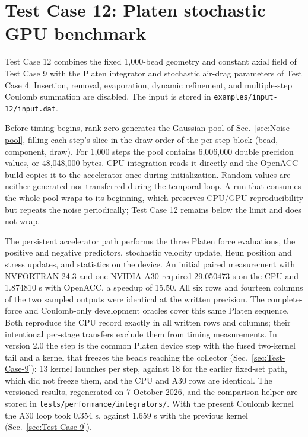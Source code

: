 \section{Test Case 12: Platen stochastic GPU benchmark}

Test Case 12 combines the fixed 1,000-bead geometry and constant axial field
of Test Case 9 with the Platen integrator and stochastic air-drag parameters
of Test Case 4. Insertion, removal, evaporation, dynamic refinement, and
multiple-step Coulomb summation are disabled. The input is stored in
\texttt{examples/input-12/input.dat}.

Before timing begins, rank zero generates the Gaussian pool of
Sec.~\ref{sec:Noise-pool}, filling each step's slice in the draw order of the
per-step block (bead, component, draw). For 1,000 steps the pool contains
6,006,000 double precision values, or 48,048,000 bytes. CPU integration reads
it directly and the OpenACC build copies it to the accelerator once during
initialization. Random values are neither generated nor transferred during
the temporal loop. A run that consumes the whole pool wraps to its beginning,
which preserves CPU/GPU reproducibility but repeats the noise periodically;
Test Case 12 remains below the limit and does not wrap.

The persistent accelerator path performs the three Platen force evaluations,
the positive and negative predictors, stochastic velocity update, Heun
position and stress updates, and statistics on the device. An initial paired
measurement with NVFORTRAN 24.3 and one NVIDIA A30 required 29.050473 s on the
CPU and 1.874810 s with OpenACC, a speedup of 15.50. All six rows and fourteen
columns of the two sampled outputs were identical at the written precision.
The complete-force and Coulomb-only development oracles cover this same
Platen sequence. Both reproduce the CPU record exactly in all written rows
and columns; their intentional per-stage transfers exclude them from timing
measurements.
In version 2.0 the step is the common Platen device step with the fused
two-kernel tail and a kernel that freezes the beads reaching the collector
(Sec.~\ref{sec:Test-Case-9}): 13 kernel launches per step, against 18 for
the earlier fixed-set path, which did not freeze them, and the CPU and A30
rows are identical. The versioned results, regenerated on 7 October 2026,
and the comparison helper are stored in
\texttt{tests/performance/integrators/}. With the present Coulomb kernel
the A30 loop took 0.354 s, against 1.659 s with the previous kernel
(Sec.~\ref{sec:Test-Case-9}).
